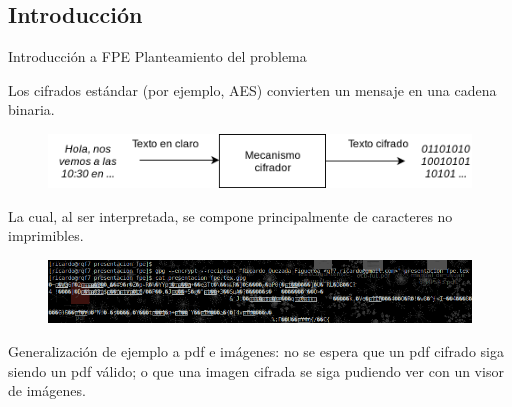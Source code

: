 %
%

\subsection{Introducción}

\begin{frame}{Introducción a FPE}
  {Planteamiento del problema}

  Los cifrados estándar (por ejemplo, AES) convierten un mensaje en una
  cadena binaria.

  \begin{figure}[H]
    \begin{center}
      \includegraphics[width=0.75\linewidth]{diagramas/cifrador_estandar.png}
    \end{center}
  \end{figure}


  La cual, al ser interpretada, se compone principalmente de caracteres no
  imprimibles.

  \begin{figure}[H]
    \begin{center}
      \includegraphics[width=1.0\linewidth]{diagramas/no_imprimibles.png}
    \end{center}
  \end{figure}

  {
    Generalización de ejemplo a pdf e imágenes: no se espera que un pdf cifrado
    siga siendo un pdf válido; o que una imagen cifrada se siga pudiendo
    ver con un visor de imágenes.
  }

\end{frame}

